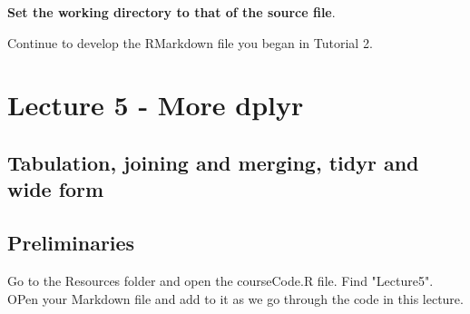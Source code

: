 \documentclass[titlepage]{book}\usepackage{knitr}
\begin{document}
\begin{knitrout}
\color{fgcolor}\begin{kframe}
\begin{alltt}
\hlstd{(}\hlstd{)}
 \hlkwb{<-} 
\end{alltt}
\end{kframe}
\end{knitrout}


\textbf{Set the working directory to that of the source file}.

Continue to develop the RMarkdown file you began in Tutorial 2.













\chapter{Lecture 5 - More dplyr}
\label{Lecture5}
\section*{Tabulation, joining and merging, tidyr and wide form}

\author{Brian Williams $<$\href{mailto:bjw649@gmail.com}%
{bjw649@gmail.com}$>$}


\section{Preliminaries}

Go to the Resources folder and open the courseCode.R file.  Find "Lecture5".
OPen your Markdown file and add to it as we go through the code in this lecture.


\begin{knitrout}
\color{fgcolor}\begin{kframe}
\begin{alltt}
\hlstd{(}\hlstd{)}
 \hlkwb{<-} 
\end{alltt}
\end{kframe}
\end{knitrout}
\end{document}
